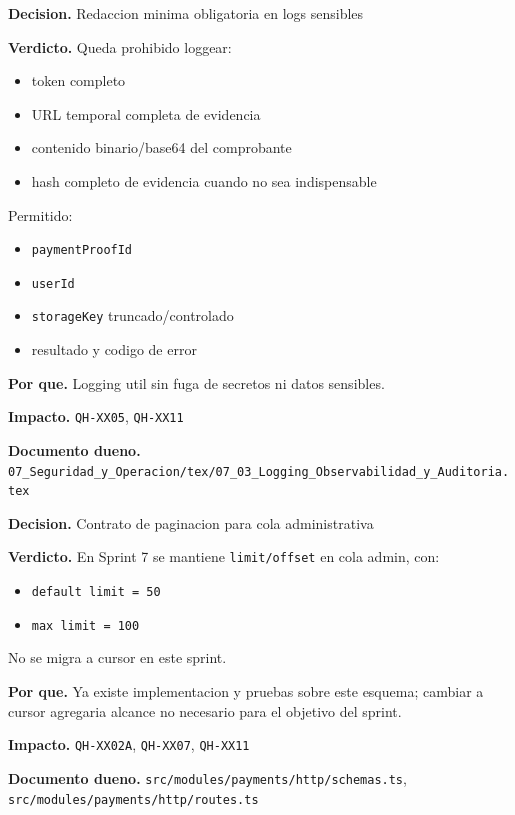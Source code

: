\begin{docnote}
\textbf{Decision.} Redaccion minima obligatoria en logs sensibles

\textbf{Verdicto.} Queda prohibido loggear:
\begin{itemize}
  \item token completo
  \item URL temporal completa de evidencia
  \item contenido binario/base64 del comprobante
  \item hash completo de evidencia cuando no sea indispensable
\end{itemize}
Permitido:
\begin{itemize}
  \item \texttt{paymentProofId}
  \item \texttt{userId}
  \item \texttt{storageKey} truncado/controlado
  \item resultado y codigo de error
\end{itemize}

\textbf{Por que.} Logging util sin fuga de secretos ni datos sensibles.

\textbf{Impacto.} \texttt{QH-XX05}, \texttt{QH-XX11}

\textbf{Documento dueno.} \texttt{07\_Seguridad\_y\_Operacion/tex/07\_03\_Logging\_Observabilidad\_y\_Auditoria.tex}
\end{docnote}

\begin{docnote}
\textbf{Decision.} Contrato de paginacion para cola administrativa

\textbf{Verdicto.} En Sprint 7 se mantiene \texttt{limit/offset} en cola admin, con:
\begin{itemize}
  \item \texttt{default limit = 50}
  \item \texttt{max limit = 100}
\end{itemize}
No se migra a cursor en este sprint.

\textbf{Por que.} Ya existe implementacion y pruebas sobre este esquema; cambiar a cursor agregaria alcance no necesario para el objetivo del sprint.

\textbf{Impacto.} \texttt{QH-XX02A}, \texttt{QH-XX07}, \texttt{QH-XX11}

\textbf{Documento dueno.} \texttt{src/modules/payments/http/schemas.ts}, \texttt{src/modules/payments/http/routes.ts}
\end{docnote}

